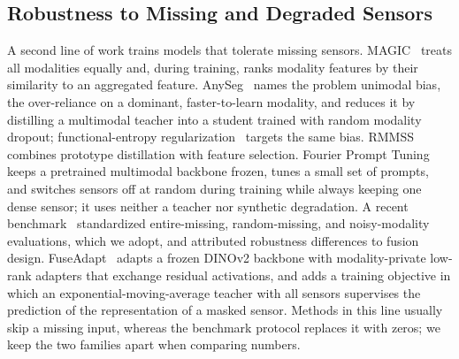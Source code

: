\subsection{Robustness to Missing and Degraded Sensors}
A second line of work trains models that tolerate missing sensors. MAGIC~\cite{magic2024,magicpp2024} treats all modalities equally and, during training, ranks modality features by their similarity to an aggregated feature. AnySeg~\cite{anyseg2024} names the problem unimodal bias, the over-reliance on a dominant, faster-to-learn modality, and reduces it by distilling a multimodal teacher into a student trained with random modality dropout; functional-entropy regularization~\cite{zheng2025entropy} targets the same bias. RMMSS~\cite{rmmss2025} combines prototype distillation with feature selection. Fourier Prompt Tuning~\cite{liu2024fpt} keeps a pretrained multimodal backbone frozen, tunes a small set of prompts, and switches sensors off at random during training while always keeping one dense sensor; it uses neither a teacher nor synthetic degradation. A recent benchmark~\cite{mmssbench2025} standardized entire-missing, random-missing, and noisy-modality evaluations, which we adopt, and attributed robustness differences to fusion design. FuseAdapt~\cite{fuseadapt2026} adapts a frozen DINOv2 backbone with modality-private low-rank adapters that exchange residual activations, and adds a training objective in which an exponential-moving-average teacher with all sensors supervises the prediction of the representation of a masked sensor. Methods in this line usually skip a missing input, whereas the benchmark protocol replaces it with zeros; we keep the two families apart when comparing numbers.


